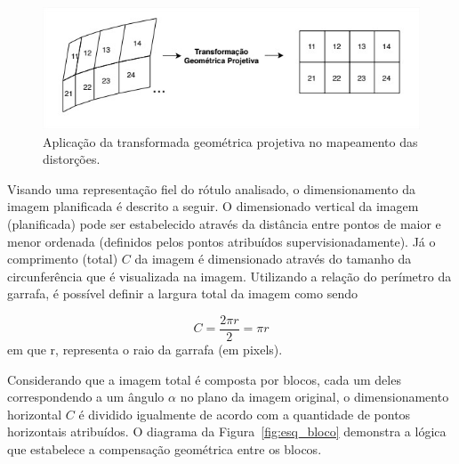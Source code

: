 \begin{figure}[htb]
    \caption{Aplicação da transformada geométrica projetiva no mapeamento das distorções.}
    \centering
    \vspace{0.25cm}
    \begin{minipage}{\textwidth}
      \centering
         \includegraphics[width=\textwidth]{TCC/Imagens/transform_esq.jpg}
	\end{minipage}
    \label{fig:quad}
\end{figure}


Visando uma representação fiel do rótulo analisado, o dimensionamento da imagem planificada é descrito a seguir. O dimensionado vertical da imagem (planificada) pode ser estabelecido através da distância entre pontos de maior e menor ordenada (definidos pelos pontos atribuídos supervisionadamente). Já o comprimento (total) $C$ da imagem é dimensionado através do tamanho da circunferência que é visualizada na imagem. Utilizando a relação do perímetro da garrafa, é possível definir a largura total da imagem como sendo

\begin{equation}
    C = \frac{2 \pi r}{2} = \pi r
    \label{equacao:largura_imagem}
\end{equation}
em que r, representa o raio da garrafa (em pixels).

Considerando que a imagem total é composta por blocos, cada um deles correspondendo a um ângulo $\alpha$ no plano da imagem original, o dimensionamento horizontal $C$ é dividido igualmente de acordo com a quantidade de pontos horizontais atribuídos. O diagrama da Figura~\ref{fig:esq_bloco} demonstra a lógica que estabelece a compensação geométrica entre os blocos.

